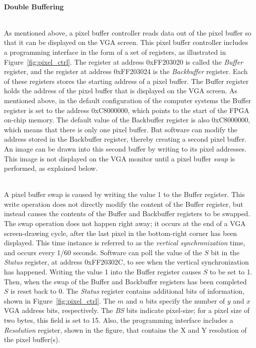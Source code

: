 \documentclass[epsfig,10pt,fullpage]{article}
\begin{document}
~\\
\noindent
{\bf Double Buffering}
\label{sec:double_buffer}

~\\
\noindent
As mentioned above, a pixel buffer controller reads data out of the pixel buffer so that it 
can be displayed on the VGA screen. This pixel buffer controller 
includes a programming interface in the form of a set of registers, as
illustrated in Figure~\ref{fig:pixel_ctrl}. The register at address {\sf 0xFF203020} is called 
the {\it Buffer} register, and the register at address  {\sf 0xFF203024} is the 
{\it Backbuffer} register. Each of these registers stores the starting address of a pixel 
buffer.  The Buffer register holds the address of the pixel buffer that is displayed on
the VGA screen. As mentioned above, in the default configuration of the computer systems the 
Buffer register is set to the address {\sf 0xC8000000}, which points to the start of the FPGA 
on-chip memory.  The default value of the Backbuffer register is also {\sf 0xC8000000},
which means that there is only one pixel buffer. But software can modify the address
stored in the Backbuffer register, thereby creating a second pixel buffer. An image can be
drawn into this second buffer by writing to its pixel addresses. This image is not displayed 
on the VGA monitor until a pixel buffer {\it swap} is performed, as explained below.

~\\
\noindent
A pixel buffer swap is caused by writing the value 1 to the Buffer register. This write
operation does not directly modify the content of the Buffer register, but instead causes
the contents of the Buffer and Backbuffer registers to be swapped. The swap operation does
not happen right away; it occurs at the end of a VGA screen-drawing cycle, after the last 
pixel in the bottom-right corner has been displayed. This time instance is referred to as
the {\it vertical synchronization} time, and occurs every 1/60 seconds. Software can poll the
value of the $S$ bit in the {\it Status} register, at address {\sf 0xFF20302C}, to see when 
the vertical synchronization has happened. Writing the value 1 into the Buffer register
causes $S$ to be set to 1. Then, when the swap of the Buffer and Backbuffer registers 
has been completed $S$ is reset back to 0. The {\it Status} register contains additional bits 
of information, shown in Figure~\ref{fig:pixel_ctrl}. The $m$ and $n$ bits specify the number 
of $y$ and $x$ VGA address bits, respectively. The {\it BS} bits indicate pixel-size; for
a pixel size of two bytes, this field is set to 15. Also, the programming interface includes 
a {\it Resolution} register, shown in the figure, that contains the X and Y resolution of 
the pixel buffer(s).  
\end{document}
